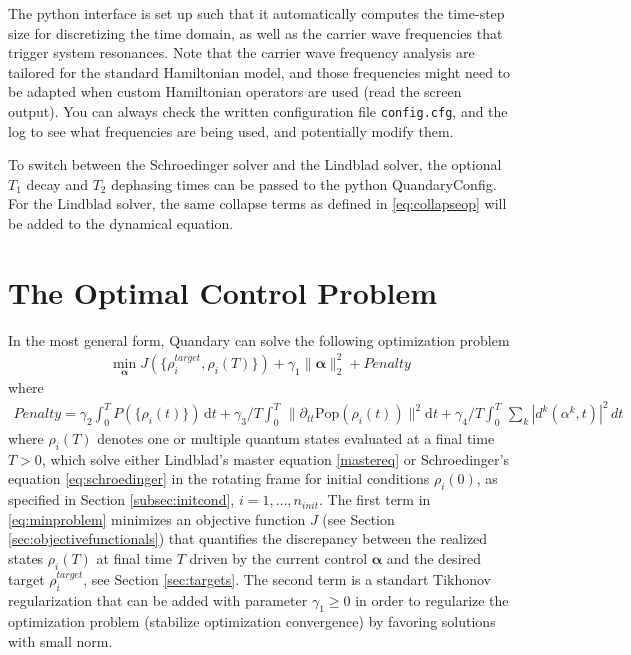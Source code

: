 \documentclass[11pt]{article}
\newcommand{\bfa}{\boldsymbol{\alpha}}
\begin{document}
The python interface is set up such that it automatically computes the time-step size for discretizing the time domain, as well as the carrier wave frequencies that trigger system resonances. Note that the carrier wave frequency analysis are tailored for the standard Hamiltonian model, and those frequencies might need to be adapted when custom Hamiltonian operators are used (read the screen output). You can always check the written configuration file \texttt{config.cfg}, and the log to see what frequencies are being used, and potentially modify them. 

To switch between the Schroedinger solver and the Lindblad solver, the optional $T_1$ decay and $T_2$ dephasing times can be passed to the python QuandaryConfig. For the Lindblad solver, the same collapse terms as defined in \eqref{eq:collapseop} will be added to the dynamical equation. 

\section{The Optimal Control Problem} \label{sec:optim}
In the most general form, Quandary can solve the following optimization problem
\begin{align}\label{eq:minproblem}
  \min_{\boldsymbol{\alpha}} J(\{\rho^{target}_i, \rho_i(T) \}) + \gamma_1 \| \bfa \|^2_2 + Penalty
\end{align}
where
\begin{align}
   Penalty = \gamma_2 \int_0^T P\left(\{\rho_i(t)\}\right) \, \mathrm{d} t +  \gamma_3 /T \int_0^T \, \| \partial_{tt} \mbox{Pop}(\rho_i(t)) \|^2 \mathrm{d}t + \gamma_4/T \int_0^T \, \sum_k |d^k(\alpha^k,t)|^2\, dt
\end{align}
where $\rho_i(T)$ denotes one or multiple quantum states evaluated at a final time $T>0$, which solve either Lindblad's master equation \eqref{mastereq} or Schroedinger's equation \eqref{eq:schroedinger} in the rotating frame for initial conditions $\rho_i(0)$, as specified in Section \ref{subsec:initcond}, $i=1,\dots, n_{init}$. The first term in \eqref{eq:minproblem} minimizes an objective function $J$ (see Section \ref{sec:objectivefunctionals}) that quantifies the discrepancy between the realized states $\rho_i(T)$ at final time $T$ driven by the current control $\boldsymbol{\alpha}$ and the desired target $\rho^{target}_i$, see Section \ref{sec:targets}. 
The second term is a standart Tikhonov regularization that can be added with parameter $\gamma_1\geq 0$ in order to regularize the optimization problem (stabilize optimization convergence) by favoring solutions with small norm. 
\end{document}
